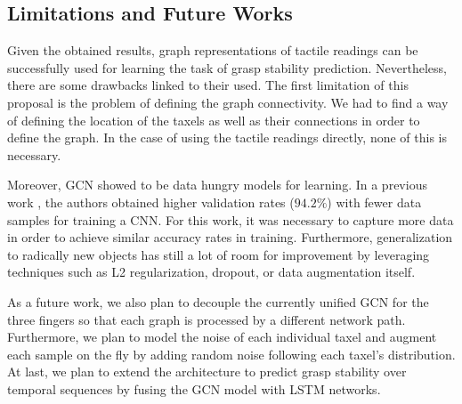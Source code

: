 \subsection{Limitations and Future Works}
\label{cha:tactile:sec:conclusion:subsec:limitations}

Given the obtained results, graph representations of tactile readings can be successfully used for learning the task of grasp stability prediction. Nevertheless, there are some drawbacks linked to their used. The first limitation of this proposal is the problem of defining the graph connectivity. We had to find a way of defining the location of the taxels as well as their connections in order to define the graph. In the case of using the tactile readings directly, none of this is necessary.

Moreover, \ac{GCN} showed to be data hungry models for learning. In a previous work \cite{Zapata2018}, the authors obtained higher validation rates ($94.2\%$) with fewer data samples for training a \ac{CNN}. For this work, it was necessary to capture more data in order to achieve similar accuracy rates in training. Furthermore, generalization to radically new objects has still a lot of room for improvement by leveraging techniques such as L2 regularization, dropout, or data augmentation
itself.

As a future work, we also plan to decouple the currently unified \ac{GCN} for the three fingers so that each graph is processed by a different network path. Furthermore, we plan to model the noise of each individual taxel and augment each sample on the fly by adding random noise following each taxel's distribution. At last, we plan to extend the architecture to predict grasp stability over temporal sequences by fusing the \ac{GCN} model with \ac{LSTM} networks.